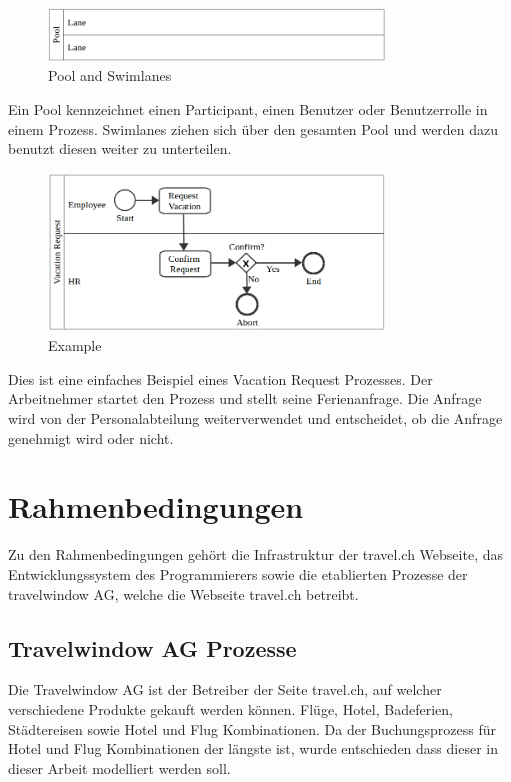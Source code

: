 \begin{figure}[H]
	\centering
	\includegraphics[width=0.8\textwidth]{images/bpmn-pool-swimlanes.png}
	\caption{Pool and Swimlanes}
	\label{fig:recherche:bpmn:poolswimlanes}
\end{figure}
Ein Pool kennzeichnet einen Participant, einen Benutzer oder Benutzerrolle in einem Prozess. Swimlanes ziehen sich über den gesamten Pool und werden dazu benutzt diesen weiter zu unterteilen.

\begin{figure}[H]
	\centering
	\includegraphics[width=0.8\textwidth]{images/bpmn-example.png}
	\caption{Example}
	\label{fig:recherche:bpmn:example}
\end{figure}
Dies ist eine einfaches Beispiel eines Vacation Request Prozesses. Der Arbeitnehmer startet den Prozess und stellt seine Ferienanfrage. Die Anfrage wird von der Personalabteilung weiterverwendet und entscheidet, ob die Anfrage genehmigt wird oder nicht.

\section{Rahmenbedingungen}
Zu den Rahmenbedingungen gehört die Infrastruktur der travel.ch Webseite, das Entwicklungssystem des Programmierers sowie die etablierten Prozesse der travelwindow AG, welche die Webseite travel.ch betreibt.

\subsection{Travelwindow AG Prozesse}
\label{sec:Recherche:rahmenbedingungen:prozesse}
Die Travelwindow AG ist der Betreiber der Seite travel.ch, auf welcher verschiedene Produkte gekauft werden können. Flüge, Hotel, Badeferien, Städtereisen sowie Hotel und Flug Kombinationen. Da der Buchungsprozess für Hotel und Flug Kombinationen der längste ist, wurde entschieden dass dieser in dieser Arbeit modelliert werden soll. 

